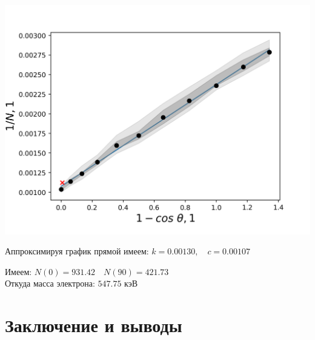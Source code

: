 \documentclass[12pt,a4paper]{article}
\begin{document}
        \includegraphics[width=\textwidth]{res/graph.png}

        Аппроксимируя график прямой имеем: \(k = 0.00130, \quad c = 0.00107\)

        Имеем: \(N(0) = 931.42 \quad N(90) = 421.73\)\\

        Откуда масса электрона: \(547.75\) кэВ
	

	\section*{Заключение и выводы}
	
\end{document}
